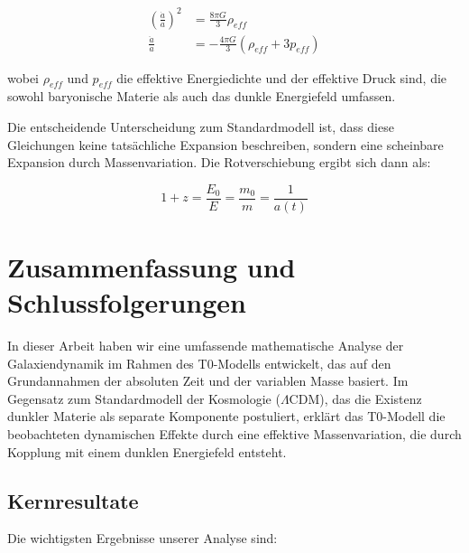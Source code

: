 \documentclass[a4paper,12pt]{article}
\begin{document}
	\begin{align}
		\left(\frac{\dot{a}}{a}\right)^2 &= \frac{8\pi G}{3}\rho_{eff}\\
		\frac{\ddot{a}}{a} &= -\frac{4\pi G}{3}(\rho_{eff} + 3p_{eff})
	\end{align}
	
	wobei $\rho_{eff}$ und $p_{eff}$ die effektive Energiedichte und der effektive Druck sind, die sowohl baryonische Materie als auch das dunkle Energiefeld umfassen.
	
	Die entscheidende Unterscheidung zum Standardmodell ist, dass diese Gleichungen keine tatsächliche Expansion beschreiben, sondern eine scheinbare Expansion durch Massenvariation. Die Rotverschiebung ergibt sich dann als:
	
	\begin{equation}
		1 + z = \frac{E_0}{E} = \frac{m_0}{m} = \frac{1}{a(t)}
	\end{equation}
	
	\section{Zusammenfassung und Schlussfolgerungen}
	
	In dieser Arbeit haben wir eine umfassende mathematische Analyse der Galaxiendynamik im Rahmen des T0-Modells entwickelt, das auf den Grundannahmen der absoluten Zeit und der variablen Masse basiert. Im Gegensatz zum Standardmodell der Kosmologie ($\Lambda$CDM), das die Existenz dunkler Materie als separate Komponente postuliert, erklärt das T0-Modell die beobachteten dynamischen Effekte durch eine effektive Massenvariation, die durch Kopplung mit einem dunklen Energiefeld entsteht.
	
	\subsection{Kernresultate}
	
	Die wichtigsten Ergebnisse unserer Analyse sind:
	
\end{document}

